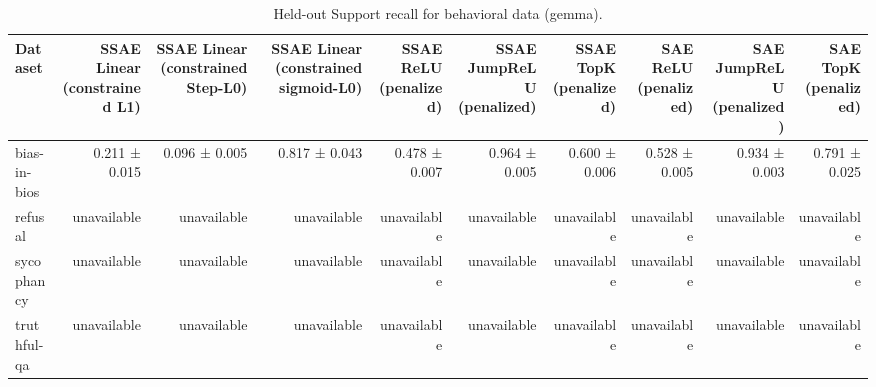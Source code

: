 \begin{table}[t]
\centering
\caption{Held-out Support recall for behavioral data (gemma).}
\label{tab:behavioral-gemma-support-recall}
\begin{tabular}{lrrrrrrrrr}
\toprule
Dataset & SSAE Linear (constrained L1) & SSAE Linear (constrained Step-L0) & SSAE Linear (constrained sigmoid-L0) & SSAE ReLU (penalized) & SSAE JumpReLU (penalized) & SSAE TopK (penalized) & SAE ReLU (penalized) & SAE JumpReLU (penalized) & SAE TopK (penalized) \\
\midrule
bias-in-bios & 0.211 ± 0.015 & 0.096 ± 0.005 & 0.817 ± 0.043 & 0.478 ± 0.007 & 0.964 ± 0.005 & 0.600 ± 0.006 & 0.528 ± 0.005 & 0.934 ± 0.003 & 0.791 ± 0.025 \\
refusal & unavailable & unavailable & unavailable & unavailable & unavailable & unavailable & unavailable & unavailable & unavailable \\
sycophancy & unavailable & unavailable & unavailable & unavailable & unavailable & unavailable & unavailable & unavailable & unavailable \\
truthful-qa & unavailable & unavailable & unavailable & unavailable & unavailable & unavailable & unavailable & unavailable & unavailable \\
\bottomrule
\end{tabular}
\end{table}
